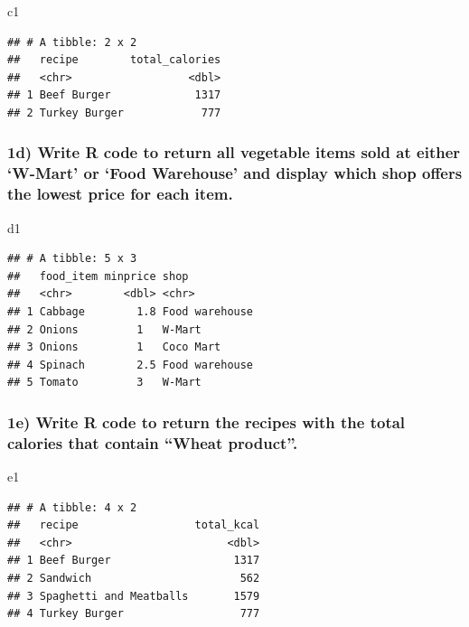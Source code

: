 \documentclass[
]{article}
\newenvironment{Shaded}{\begin{snugshade}}{\end{snugshade}}
\newcommand{\NormalTok}[1]{#1}
\begin{document}
\begin{Shaded}
\begin{Highlighting}[]
\NormalTok{c1}
\end{Highlighting}
\end{Shaded}

\begin{verbatim}
## # A tibble: 2 x 2
##   recipe        total_calories
##   <chr>                  <dbl>
## 1 Beef Burger             1317
## 2 Turkey Burger            777
\end{verbatim}

\subsubsection{1d) Write R code to return all vegetable items sold at
either `W-Mart' or `Food Warehouse' and display which shop offers the
lowest price for each
item.}\label{d-write-r-code-to-return-all-vegetable-items-sold-at-either-w-mart-or-food-warehouse-and-display-which-shop-offers-the-lowest-price-for-each-item.}

\begin{Shaded}
\begin{Highlighting}[]
\NormalTok{d1}
\end{Highlighting}
\end{Shaded}

\begin{verbatim}
## # A tibble: 5 x 3
##   food_item minprice shop          
##   <chr>        <dbl> <chr>         
## 1 Cabbage        1.8 Food warehouse
## 2 Onions         1   W-Mart        
## 3 Onions         1   Coco Mart     
## 4 Spinach        2.5 Food warehouse
## 5 Tomato         3   W-Mart
\end{verbatim}

\subsubsection{1e) Write R code to return the recipes with the total
calories that contain ``Wheat
product''.}\label{e-write-r-code-to-return-the-recipes-with-the-total-calories-that-contain-wheat-product.}

\begin{Shaded}
\begin{Highlighting}[]
\NormalTok{e1}
\end{Highlighting}
\end{Shaded}

\begin{verbatim}
## # A tibble: 4 x 2
##   recipe                  total_kcal
##   <chr>                        <dbl>
## 1 Beef Burger                   1317
## 2 Sandwich                       562
## 3 Spaghetti and Meatballs       1579
## 4 Turkey Burger                  777
\end{verbatim}
\end{document}
